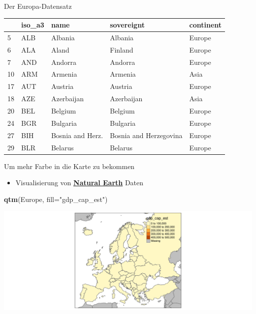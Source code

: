 \documentclass[ignorenonframetext,]{beamer}
\newenvironment{Shaded}{\begin{snugshade}}{\end{snugshade}}
\newcommand{\KeywordTok}[1]{\textcolor[rgb]{0.13,0.29,0.53}{\textbf{#1}}}
\newcommand{\DataTypeTok}[1]{\textcolor[rgb]{0.13,0.29,0.53}{#1}}
\newcommand{\StringTok}[1]{\textcolor[rgb]{0.31,0.60,0.02}{#1}}
\newcommand{\NormalTok}[1]{#1}
\providecommand{\tightlist}{%
  \setlength{\itemsep}{0pt}\setlength{\parskip}{0pt}}
\begin{document}
\begin{frame}{Der Europa-Datensatz}

\begin{longtable}[]{@{}lllll@{}}
\toprule
& iso\_a3 & name & sovereignt & continent\tabularnewline
\midrule
\endhead
5 & ALB & Albania & Albania & Europe\tabularnewline
6 & ALA & Aland & Finland & Europe\tabularnewline
7 & AND & Andorra & Andorra & Europe\tabularnewline
10 & ARM & Armenia & Armenia & Asia\tabularnewline
17 & AUT & Austria & Austria & Europe\tabularnewline
18 & AZE & Azerbaijan & Azerbaijan & Asia\tabularnewline
20 & BEL & Belgium & Belgium & Europe\tabularnewline
24 & BGR & Bulgaria & Bulgaria & Europe\tabularnewline
27 & BIH & Bosnia and Herz. & Bosnia and Herzegovina &
Europe\tabularnewline
29 & BLR & Belarus & Belarus & Europe\tabularnewline
\bottomrule
\end{longtable}

\end{frame}

\begin{frame}[fragile]{Um mehr Farbe in die Karte zu bekommen}

\begin{itemize}
\tightlist
\item
  Visualisierung von
  \href{http://www.naturalearthdata.com/}{\textbf{Natural Earth}} Daten
\end{itemize}

\begin{Shaded}
\begin{Highlighting}[]
\KeywordTok{qtm}\NormalTok{(Europe, }\DataTypeTok{fill=}\StringTok{"gdp_cap_est"}\NormalTok{)}
\end{Highlighting}
\end{Shaded}

\includegraphics{slides_all2gether_part1_files/figure-beamer/unnamed-chunk-50-1.pdf}

\end{frame}
\end{document}
